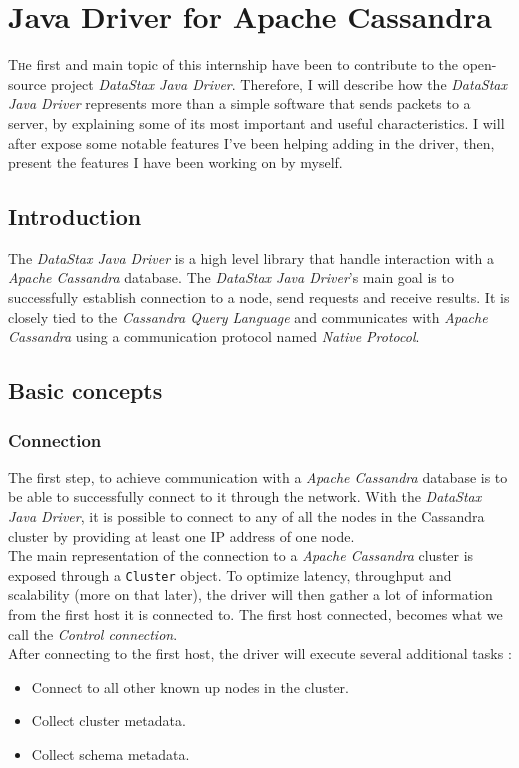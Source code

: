 \documentclass[a4paper]{report}
\newcommand{\djd}{\emph{DataStax Java Driver\xspace}}
\newcommand{\ca}{\emph{Apache Cassandra\xspace}}
\begin{document}

\chapter{Java Driver for Apache Cassandra}
\lettrine[nindent=0em,lines=3]{T} he first and main topic of this internship have been to contribute to the open-source project \djd{}. Therefore, I will describe how the \djd{} represents more than a simple software that sends packets to a server, by explaining some of its most important and useful characteristics. I will after expose some notable features I've been helping adding in the driver, then, present the features I have been working on by myself.
\section{Introduction}
The \djd{} is a high level library that handle interaction with a \ca{} database. The \djd{}'s main goal is to successfully establish connection to a node, send requests and receive results. It is closely tied to the \emph{Cassandra Query Language} and communicates with \ca{} using a communication protocol named \emph{Native Protocol}.

\section{Basic concepts}

\subsection{Connection}
The first step, to achieve communication with a \ca{} database is to be able to successfully connect to it through the network. With the \djd{}, it is possible to connect to any of all the nodes in the Cassandra cluster by providing at least one IP address of one node.\\
The main representation of the connection to a \ca{} cluster is exposed through a \verb;Cluster; object. To optimize latency, throughput and scalability (more on that later), the driver will then gather a lot of information from the first host it is connected to. The first host connected, becomes what we call the \emph{Control connection}.\\
After connecting to the first host, the driver will execute several additional tasks :
\begin{itemize}
   \item Connect to all other known up nodes in the cluster.
   \item Collect cluster metadata.
   \item Collect schema metadata.
\end{itemize}
\end{document}
